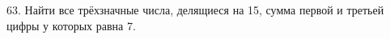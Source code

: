 63. Найти все трёхзначные числа, делящиеся на 15, сумма первой и третьей цифры у которых равна 7.\\
